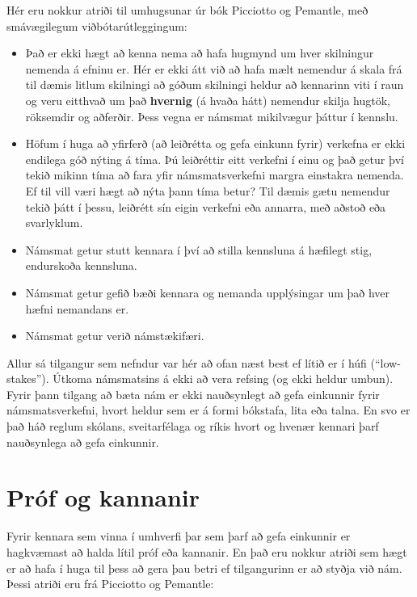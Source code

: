 \documentclass[
  icelandic,
]{book}
\providecommand{\tightlist}{%
  \setlength{\itemsep}{0pt}\setlength{\parskip}{0pt}}
\theoremstyle{definition}
\theoremstyle{definition}
\theoremstyle{definition}
\theoremstyle{definition}
\theoremstyle{remark}
\begin{document}
Hér eru nokkur atriði til umhugsunar úr bók Picciotto og Pemantle, með smávægilegum viðbótarútleggingum:

\begin{itemize}
\tightlist
\item
  Það er ekki hægt að kenna nema að hafa hugmynd um hver skilningur nemenda á efninu er. Hér er ekki átt við að hafa mælt nemendur á skala frá til dæmis litlum skilningi að góðum skilningi heldur að kennarinn viti í raun og veru eitthvað um það \textbf{hvernig} (á hvaða hátt) nemendur skilja hugtök, röksemdir og aðferðir. Þess vegna er námsmat mikilvægur þáttur í kennslu.
\item
  Höfum í huga að yfirferð (að leiðrétta og gefa einkunn fyrir) verkefna er ekki endilega góð nýting á tíma. Þú leiðréttir eitt verkefni í einu og það getur því tekið mikinn tíma að fara yfir námsmatsverkefni margra einstakra nemenda. Ef til vill væri hægt að nýta þann tíma betur? Til dæmis gætu nemendur tekið þátt í þessu, leiðrétt sín eigin verkefni eða annarra, með aðstoð eða svarlyklum.
\item
  Námsmat getur stutt kennara í því að stilla kennsluna á hæfilegt stig, endurskoða kennsluna.
\item
  Námsmat getur gefið bæði kennara og nemanda upplýsingar um það hver hæfni nemandans er.
\item
  Námsmat getur verið námstækifæri.
\end{itemize}

Allur sá tilgangur sem nefndur var hér að ofan næst best ef lítið er í húfi (``low-stakes''). Útkoma námsmatsins á ekki að vera refsing (og ekki heldur umbun). Fyrir þann tilgang að bæta nám er ekki nauðsynlegt að gefa einkunnir fyrir námsmatsverkefni, hvort heldur sem er á formi bókstafa, lita eða talna. En svo er það háð reglum skólans, sveitarfélaga og ríkis hvort og hvenær kennari þarf nauðsynlega að gefa einkunnir.

\section{Próf og kannanir}\label{pruxf3f-og-kannanir}

Fyrir kennara sem vinna í umhverfi þar sem þarf að gefa einkunnir er hagkvæmast að halda lítil próf eða kannanir. En það eru nokkur atriði sem hægt er að hafa í huga til þess að gera þau betri ef tilgangurinn er að styðja við nám. Þessi atriði eru frá Picciotto og Pemantle:
\end{document}
